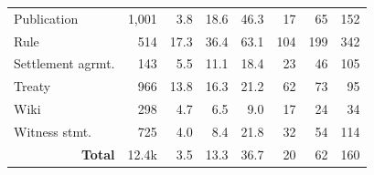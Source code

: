 \documentclass[11pt]{article}
\begin{document}
\begin{table}[t]
{\begin{tabular}{@{\hspace{0.2em}}l@{\hspace{0.5em}}rrrrrrr@{\hspace{0.2em}}}
            Publication             & 1,001 & 3.8 	& 18.6 	& 46.3 	& 17 	& 65 	& 152\\
            Rule                    & 514 	& 17.3 	& 36.4 	& 63.1 	& 104 	& 199 	& 342\\
            Settlement agrmt.       & 143 	& 5.5 	& 11.1 	& 18.4 	& 23 	& 46 	& 105\\
            Treaty                  & 966 	& 13.8 	& 16.3 	& 21.2 	& 62 	& 73 	& 95\\
            Wiki                    & 298 	& 4.7 	& 6.5 	& 9.0 	& 17 	& 24 	& 34\\
            Witness stmt.           & 725 	& 4.0 	& 8.4 	& 21.8 	& 32 	& 54 	& 114\\
            \multicolumn{1}{r}{\textbf{Total}} & 12.4k & 3.5 	& 13.3 	& 36.7 	& 20 	& 62 & 160\\
	\bottomrule
	\end{tabular}
    }
\end{table}
\end{document}

